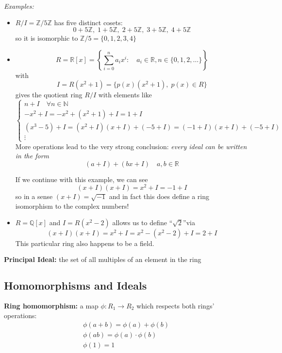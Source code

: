 \documentclass[12pt]{report}
\newcommand{\R}{\mathbb{R}}
\newcommand{\Z}{\mathbb{Z}}
\begin{document}
\emph{Examples:}
\begin{itemize}
    \item $R/I = \Z/5\Z$ has five distinct cosets:
    \[0 + 5\Z, \; 1  +5\Z, \; 2  +5\Z, \; 3  +5\Z,\; 4 + 5\Z\]
    so it is isomorphic to $\Z/5 = \{0, 1, 2, 3, 4\}$
    
    \item 
    \[R = \R[x] = \left\{\sum_{i=0}^n a_i x^i : \quad a_i \in \R, n \in \{0, 1, 2, \dots\}\right\}\] 
    with 
    \[I = R(x^2 + 1) = \{p(x)(x^2 + 1), \; p(x)\in R\}\] 
    gives the quotient ring $R/I$ with elements like
    \[\begin{cases}
        n + I \quad \forall n \in \mathbb{N}\\ 
        -x^2 + I = -x^2 + (x^2 + 1) + I = 1 + I\\ 
        (x^3 - 5) + I = (x^2 + I)(x + I) + (-5 + I) = (-1 + I)(x + I) + (-5 + I)\\
        \vdots
    \end{cases}\]
    More operations lead to the very strong conclusion: \emph{every ideal can be written in the form}
    \[\boxed{(a + I) + (bx + I) \quad a, b \in \R}\]

    If we continue with this example, we can see 
    \[(x + I)(x + I) = x^2 + I = -1 + I\]
    so in a sense $(x + I) = \sqrt{-1}$ and in fact this does define a ring isomorphism to the complex numbers! 

    \item $R = \mathbb{Q}[x]$ and $I = R(x^2- 2)$ allows us to define ``$\sqrt{2}$''via 
    \[(x + I)(x + I) = x^2 + I = x^2 - (x^2 - 2) + I = 2 + I\]
    This particular ring also happens to be a field.
\end{itemize}
\vspace*{0.25 in}

\textbf{Principal Ideal:} the set of all multiples of an element in the ring 

\subsection*{Homomorphisms and Ideals}
\textbf{Ring homomorphism:} a map $\phi: R_1 \to R_2$ which respects both rings' operations:
\begin{align*}
    \phi(a + b) = \phi(a) + \phi(b)\\ 
    \phi(ab) = \phi(a)\cdot \phi(b)\\ 
    \phi(1) = 1
\end{align*}
\end{document}
